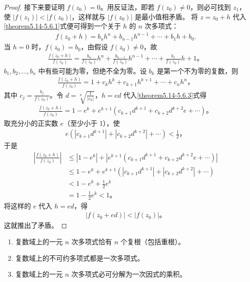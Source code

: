 \documentclass[../../main.tex]{subfiles}%
\begin{document}
\begin{proof}
接下来要证明 $f(z_0) = 0$。用反证法，即若 $f(z_0) \neq 0$，则必可找到 $z_1$，使
$|f(z_1)| < |f(z_0)|$，这样就与 $|f(z_0)|$ 是最小值相矛盾。
将 $z = z_0 + h$ 代入 \eqref{theorem5.14-5.6.1}式便可得到一个关于 $h$ 的 $n$ 次多项式：
\begin{align}
f(z_0 + h) = b_n h^n + b_{n-1} h^{n-1} + \cdots + b_1 h + b_0. \label{theorem5.14-5.6.2}
\end{align}
当 $h = 0$ 时，$f(z_0) = b_0$，由假设 $f(z_0) \neq 0$，故
\begin{align*}
\frac{f(z_0 + h)}{f(z_0)} = \frac{b_n}{f(z_0)} h^n + \frac{b_{n-1}}{f(z_0)} h^{n-1} + \cdots + \frac{b_1}{f(z_0)} h + 1。
\end{align*}
$b_1, b_2, \ldots, b_n$ 中有些可能为零，但绝不全为零。设 $b_k$ 是第一个不为零的复数，则
\begin{align}
\frac{f(z_0 + h)}{f(z_0)} = 1 + c_k h^k + c_{k+1} h^{k+1} + \cdots + c_n h^n， \label{theorem5.14-5.6.3}
\end{align}
其中 $c_j = \frac{b_j}{f(z_0)}$。令 $d = \sqrt[k]{\frac{1}{|c_k|}}$，$h = ed$ 代入\eqref{theorem5.14-5.6.3}式得
\begin{align*}
\frac{f(z_0 + h)}{f(z_0)} = 1 - e^k + e^{k+1} (c_{k+1} d^{k+1} + c_{k+2} d^{k+2} e + \cdots)。
\end{align*}
取充分小的正实数 $e$（至少小于 1），使
\begin{align*}
e (|c_{k+1} d^{k+1}| + |c_{k+2} d^{k+2}| + \cdots) < \frac{1}{2}，
\end{align*}
于是
\begin{align*}
\left| \frac{f(z_0 + h)}{f(z_0)} \right| &\leqslant  |1 - e^k| + |e^{k+1} (c_{k+1} d^{k+1} + c_{k+2} d^{k+2} e + \cdots)| \\
&\leqslant  1 - e^k + e^{k+1} (|c_{k+1} d^{k+1}| + |c_{k+2} d^{k+2}| + \cdots) \\
&< 1 - e^k + \frac{1}{2} e^k \\
&= 1 - \frac{1}{2} e^k < 1。
\end{align*}
将这样的 $e$ 代入 $h = ed$，得
\begin{align*}
|f(z_0 + ed)| < |f(z_0)|。
\end{align*}
这就推出了矛盾。

\end{proof}

\begin{corollary}
\begin{enumerate}
\item 复数域上的一元 $n$ 次多项式恰有 $n$ 个复根（包括重根）。

\item 复数域上的不可约多项式都是一次多项式。

\item 复数域上的一元 $n$ 次多项式必可分解为一次因式的乘积。
\end{enumerate}
\end{corollary}
\end{document}
